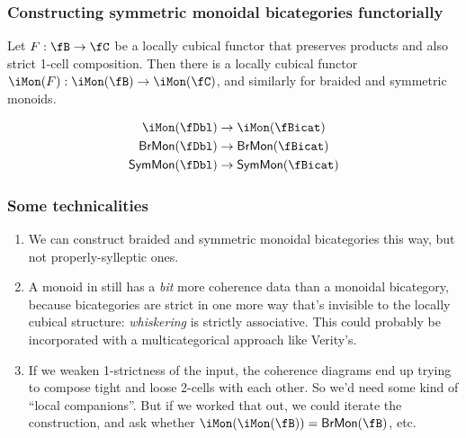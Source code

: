 \documentclass{beamer}
\begin{document}
\begin{frame}
  \frametitle{Constructing symmetric monoidal bicategories functorially}
  \begin{theorem}[Hansen-S.]
    Let $F:\fB\to\fC$ be a locally cubical functor that preserves products and also strict 1-cell composition.
    Then there is a locally cubical functor $\iMon(F) : \iMon(\fB) \to \iMon(\fC)$, and similarly for braided and symmetric monoids.
  \end{theorem}
  \begin{example}\vspace{-.7cm}
    \begin{align*}
      \iMon(\fDbl) &\to \iMon(\fBicat)\\
      \mathsf{BrMon}(\fDbl) &\to \mathsf{BrMon}(\fBicat)\\
      \mathsf{SymMon}(\fDbl) &\to \mathsf{SymMon}(\fBicat)
    \end{align*}
  \end{example}
\end{frame}

\begin{frame}
  \frametitle{Some technicalities}
  \begin{enumerate}
  \item We can construct braided and symmetric monoidal bicategories this way, but not properly-sylleptic ones.
  \item A monoid in \fBicat still has a \emph{bit} more coherence data than a monoidal bicategory, because bicategories are strict in one more way that's invisible to the locally cubical structure: \emph{whiskering} is strictly associative.
    This could probably be incorporated with a multicategorical approach like Verity's.
  \item If we weaken 1-strictness of the input, the coherence diagrams end up trying to compose tight and loose 2-cells with each other.
    So we'd need some kind of ``local companions''.
    But if we worked that out, we could iterate the construction, and ask whether $\iMon(\iMon(\fB)) = \mathsf{BrMon}(\fB)$, etc.
  \end{enumerate}
\end{frame}
\end{document}
